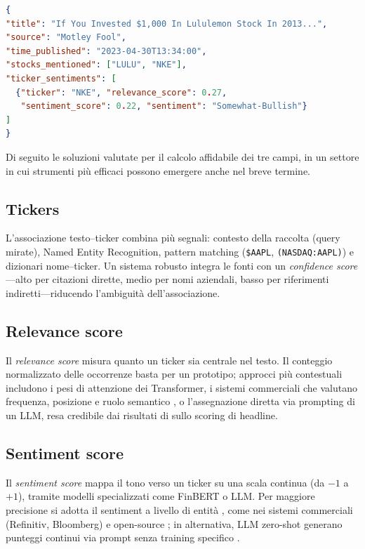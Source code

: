 \begin{lstlisting}[language=json]
{
"title": "If You Invested $1,000 In Lululemon Stock In 2013...",
"source": "Motley Fool",
"time_published": "2023-04-30T13:34:00",
"stocks_mentioned": ["LULU", "NKE"],
"ticker_sentiments": [
  {"ticker": "NKE", "relevance_score": 0.27,
   "sentiment_score": 0.22, "sentiment": "Somewhat-Bullish"}
]
}
\end{lstlisting}

Di seguito le soluzioni valutate per il calcolo affidabile dei tre campi, in un settore in cui strumenti più efficaci possono emergere anche nel breve termine.

\subsection{Tickers}

L'associazione testo--ticker combina più segnali: contesto della raccolta (query mirate), Named Entity Recognition, pattern matching (\verb|$AAPL|, \verb|(NASDAQ:AAPL)|) e dizionari nome--ticker.
Un sistema robusto integra le fonti con un \emph{confidence score}---alto per citazioni dirette, medio per nomi aziendali, basso per riferimenti indiretti---riducendo l'ambiguità dell'associazione.

\subsection{Relevance score}

Il \textit{relevance score} misura quanto un ticker sia centrale nel testo.
Il conteggio normalizzato delle occorrenze basta per un prototipo; approcci più contestuali includono i pesi di attenzione dei Transformer, i sistemi commerciali che valutano frequenza, posizione e ruolo semantico \parencite{ravenpack_relevance}, o l'assegnazione diretta via prompting di un LLM, resa credibile dai risultati di \textcite{lopezlira2024chatgptforecaststockprice} sullo scoring di headline.

\subsection{Sentiment score}

Il \textit{sentiment score} mappa il tono verso un ticker su una scala continua (da $-1$ a $+1$), tramite modelli specializzati come FinBERT o LLM.
Per maggiore precisione si adotta il sentiment a livello di entità \parencite{tang-etal-2023-finentity}, come nei sistemi commerciali (Refinitiv, Bloomberg) e open-source \parencite{yang2023fingptopensourcefinanciallarge}; in alternativa, LLM zero-shot generano punteggi continui via prompt senza training specifico \parencite{bdcc8110143}.

